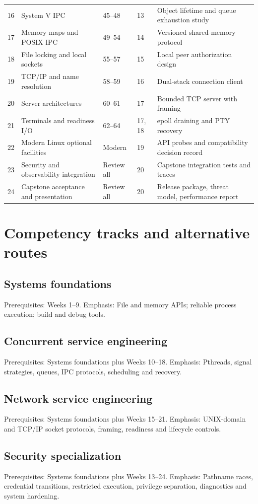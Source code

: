\documentclass[11pt,letterpaper,oneside]{report}
\begin{document}
\begin{longtable}{p{.065\linewidth}p{.245\linewidth}p{.115\linewidth}p{.12\linewidth}p{.35\linewidth}}
16 & System V IPC & 45--48 & 13 & Object lifetime and queue exhaustion study\\
17 & Memory maps and POSIX IPC & 49--54 & 14 & Versioned shared-memory protocol\\
18 & File locking and local sockets & 55--57 & 15 & Local peer authorization design\\
19 & TCP/IP and name resolution & 58--59 & 16 & Dual-stack connection client\\
20 & Server architectures & 60--61 & 17 & Bounded TCP server with framing\\
21 & Terminals and readiness I/O & 62--64 & 17, 18 & epoll draining and PTY recovery\\
22 & Modern Linux optional facilities & Modern & 19 & API probes and compatibility decision record\\
23 & Security and observability integration & Review all & 20 & Capstone integration tests and traces\\
24 & Capstone acceptance and presentation & Review all & 20 & Release package, threat model, performance report\\
\bottomrule\end{longtable}\normalsize\setlength{\tabcolsep}{6pt}\chapter{Competency tracks and alternative routes}
\section{Systems foundations}
Prerequisites: Weeks 1--9. Emphasis: File and memory APIs; reliable process execution; build and debug tools.

\section{Concurrent service engineering}
Prerequisites: Systems foundations plus Weeks 10--18. Emphasis: Pthreads, signal strategies, queues, IPC protocols, scheduling and recovery.

\section{Network service engineering}
Prerequisites: Systems foundations plus Weeks 15--21. Emphasis: UNIX-domain and TCP/IP socket protocols, framing, readiness and lifecycle controls.

\section{Security specialization}
Prerequisites: Systems foundations plus Weeks 13--24. Emphasis: Pathname races, credential transitions, restricted execution, privilege separation, diagnostics and system hardening.
\end{document}
